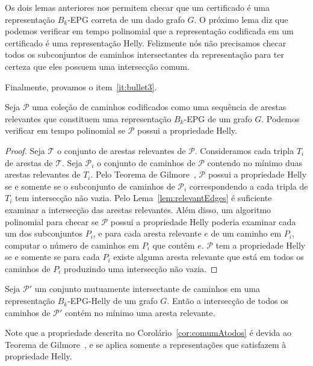 Os dois lemas anteriores nos permitem checar que um certificado é uma representação $B_k$-EPG correta de um dado grafo $G$. O próximo lema diz que podemos verificar em tempo polinomial que a representação codificada em um certificado é uma representação Helly. Felizmente nós não precisamos checar todos os subconjuntos de caminhos intersectantes da representação para ter certeza que eles possuem uma intersecção comum.

Finalmente, provamos o item~\ref{it:bullet3}.


\begin{lema}\label{lem:verify3}
Seja $\mathcal{P}$ uma coleção de caminhos codificados como uma sequência de arestas relevantes que constituem uma representação $B_k$-EPG  de um grafo  $G$. Podemos verificar em tempo polinomial se $\mathcal{P}$  possui a propriedade Helly.
\end{lema}


\begin{proof}
Seja $\mathcal{T}$ o conjunto de arestas relevantes de $\mathcal{P}$. Consideramos cada tripla $T_i$ de arestas de  $\mathcal{T}$. Seja $\mathcal{P}_i$ o conjunto de caminhos de  $\mathcal{P}$ contendo no mínimo duas arestas relevantes de $T_i$. Pelo Teorema de Gilmore~\cite{bergeDuchet1975}, $\mathcal{P}$ possui a propriedade Helly se e somente se o subconjunto de caminhos de $\mathcal{P}_i$ correspondendo a cada tripla de $T_i$ tem intersecção não vazia.  Pelo Lema~\ref{lem:relevantEdges} é suficiente examinar a intersecção das arestas relevantes.  Além disso, um algoritmo polinomial para checar se $\mathcal{P}$ possui a propriedade Helly poderia examinar cada um dos subconjuntos $P_i$, e para cada aresta relevante $e$ de um caminho em $P_i$, computar o número de caminhos em $P_i$ que contêm $e$. $\mathcal{P}$ tem a propriedade Helly se e somente se para cada $P_i$ existe alguma aresta relevante que está em todos os caminhos de $P_i$ produzindo uma intersecção não vazia.
 \end{proof} %


\begin{corollary}\label{cor:comumAtodos}
Seja ${\mathcal P'}$ um conjunto mutuamente intersectante de caminhos em uma representação $B_k$-EPG-Helly de um grafo  $G$. Então a intersecção de todos os caminhos de ${\mathcal P'}$ contém no mínimo uma aresta relevante.
\end{corollary}

Note que a propriedade descrita no Corolário~\ref{cor:comumAtodos} é devida ao Teorema de Gilmore~\cite{bergeDuchet1975}, e se aplica somente a representações que satisfazem à propriedade Helly.

